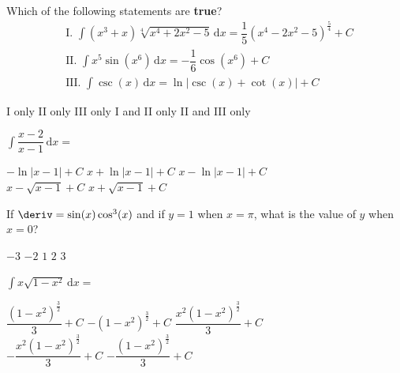 \begin{questions}
    \question Which of the following statements are \textbf{true}? \begin{align*}
        & \text{I. } \int \left(x^3 + x\right)\sqrt[4]{x^4 + 2x^2 - 5} \,\mathrm{d}x = \dfrac{1}{5}\left(x^4 - 2x^2 - 5\right)^{\frac{5}{4}} + C \\[11pt]
        & \text{II. } \int x^5\sin \left(x^6\right) \,\mathrm{d}x = -\dfrac{1}{6}\cos \left(x^6\right) + C \\[11pt]
        & \text{III. } \int \csc (x) \,\mathrm{d}x = \ln |\csc (x) + \cot (x)| + C
    \end{align*}

    \begin{oneparchoices}
        \choice I only 
        \choice II only
        \choice III only 
        \choice I and II only
        \choice II and III only
    \end{oneparchoices} \par \horizontalline

    \question $\int \dfrac{x - 2}{x - 1} \,\mathrm{d}x = $ \\

    \begin{oneparchoices}
        \choice $-\ln |x - 1| + C$
        \choice $x + \ln |x - 1| + C$
        \choice $x - \ln |x - 1| + C$ \\[11pt]
        \makebox[0.22\textwidth] \choice $x - \sqrt{x - 1} + C$
        \makebox[0.21\textwidth] \choice $x + \sqrt{x - 1} + C$
    \end{oneparchoices} \par \horizontalline

    \question If $\deriv = \sin (x)\cos^3 (x)$ and if $y = 1$ when $x = \pi$, what is the value of $y$ when $x = 0$? \\

    \begin{oneparchoices}
        \choice $-3$
        \choice $-2$
        \choice $1$
        \choice $2$
        \choice $3$
    \end{oneparchoices} \par \horizontalline

    \newpage

    \question $\int x\sqrt{1 - x^2} \,\mathrm{d}x = $ \\
    
    \begin{oneparchoices}
        \choice $\dfrac{\left(1 - x^2\right)^{\frac{3}{2}}}{3} + C$
        \choice $-\left(1 - x^2\right)^{\frac{3}{2}} + C$
        \choice $\dfrac{x^2\left(1 - x^2\right)^{\frac{3}{2}}}{3} + C$ \\[11pt]
        \makebox[0.21\textwidth] \choice $-\dfrac{x^2\left(1 - x^2\right)^{\frac{3}{2}}}{3} + C$
        \makebox[0.20\textwidth] \choice $-\dfrac{\left(1 - x^2\right)^{\frac{3}{2}}}{3} + C$
    \end{oneparchoices} \par \horizontalline


\end{questions}
